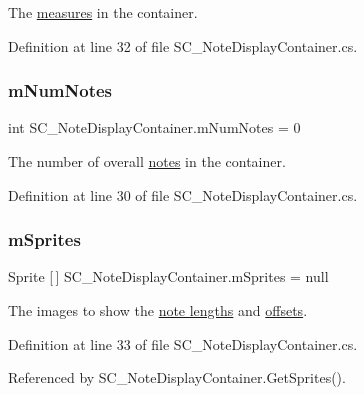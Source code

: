 The \hyperlink{group___doc_s_c___m_d_p}{measures} in the container. 



Definition at line 32 of file S\+C\+\_\+\+Note\+Display\+Container.\+cs.

\mbox{\label{group___s_c___n_d_c_priv_var_gae06a4919a63806ed57b2040f41b7ca1b}} 
\subsubsection{\texorpdfstring{m\+Num\+Notes}{mNumNotes}}
{\footnotesize\ttfamily int S\+C\+\_\+\+Note\+Display\+Container.\+m\+Num\+Notes = 0\hspace{0.3cm}{\ttfamily [private]}}



The number of overall \hyperlink{group___music_structs_struct_music_1_1_combined_note}{notes} in the container. 



Definition at line 30 of file S\+C\+\_\+\+Note\+Display\+Container.\+cs.

\mbox{\label{group___s_c___n_d_c_priv_var_gac8df613ee0996e999278da2b3f523e34}} 
\subsubsection{\texorpdfstring{m\+Sprites}{mSprites}}
{\footnotesize\ttfamily Sprite \mbox{[}$\,$\mbox{]} S\+C\+\_\+\+Note\+Display\+Container.\+m\+Sprites = null\hspace{0.3cm}{\ttfamily [private]}}



The images to show the \hyperlink{group___music_structs_ac35cd02f5b3c00e3040b51e40e9e6c94}{note lengths} and \hyperlink{group___music_structs_ae281187907aed4c728c7981300dbebaf}{offsets}. 



Definition at line 33 of file S\+C\+\_\+\+Note\+Display\+Container.\+cs.



Referenced by S\+C\+\_\+\+Note\+Display\+Container.\+Get\+Sprites().

